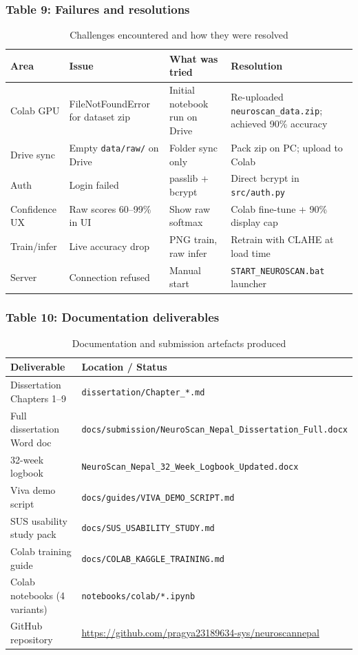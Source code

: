 \documentclass[11pt,a4paper]{article}
\begin{document}
\subsubsection{Table 9: Failures and resolutions}
\begin{table}[H]
\centering
\caption{Challenges encountered and how they were resolved}
\label{tab:failures}
\footnotesize
\begin{tabularx}{\textwidth}{|l|X|X|p{4.2cm}|}
\hline
\textbf{Area} & \textbf{Issue} & \textbf{What was tried} & \textbf{Resolution} \\
\hline
Colab GPU & FileNotFoundError for dataset zip & Initial notebook run on Drive & Re-uploaded \texttt{neuroscan\_data.zip}; achieved 90\% accuracy \\
\hline
Drive sync & Empty \texttt{data/raw/} on Drive & Folder sync only & Pack zip on PC; upload to Colab \\
\hline
Auth & Login failed & passlib + bcrypt & Direct bcrypt in \texttt{src/auth.py} \\
\hline
Confidence UX & Raw scores 60--99\% in UI & Show raw softmax & Colab fine-tune + 90\% display cap \\
\hline
Train/infer & Live accuracy drop & PNG train, raw infer & Retrain with CLAHE at load time \\
\hline
Server & Connection refused & Manual start & \texttt{START\_NEUROSCAN.bat} launcher \\
\hline
\end{tabularx}
\end{table}

\subsubsection{Table 10: Documentation deliverables}
\begin{table}[H]
\centering
\caption{Documentation and submission artefacts produced}
\label{tab:docs}
\small
\begin{tabular}{|l|p{8.5cm}|}
\hline
\textbf{Deliverable} & \textbf{Location / Status} \\
\hline
Dissertation Chapters 1--9     & \texttt{dissertation/Chapter\_*.md} \\
\hline
Full dissertation Word doc     & \texttt{docs/submission/NeuroScan\_Nepal\_Dissertation\_Full.docx} \\
\hline
32-week logbook                & \texttt{NeuroScan\_Nepal\_32\_Week\_Logbook\_Updated.docx} \\
\hline
Viva demo script               & \texttt{docs/guides/VIVA\_DEMO\_SCRIPT.md} \\
\hline
SUS usability study pack       & \texttt{docs/SUS\_USABILITY\_STUDY.md} \\
\hline
Colab training guide           & \texttt{docs/COLAB\_KAGGLE\_TRAINING.md} \\
\hline
Colab notebooks (4 variants)   & \texttt{notebooks/colab/*.ipynb} \\
\hline
GitHub repository              & \url{https://github.com/pragya23189634-sys/neuroscannepal} \\
\hline
\end{tabular}
\end{table}
\end{document}
